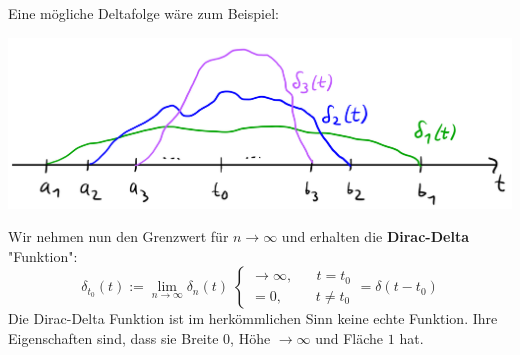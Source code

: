 \documentclass[11pt]{article}
\begin{document}
\vfill \null
\pagebreak

Eine mögliche Deltafolge wäre zum Beispiel:
\begin{center}
    \includegraphics[width=0.6\linewidth]{docimgs/Deltafolge_2.jpg}
\end{center}
Wir nehmen nun den Grenzwert für $n \to \infty$ und erhalten die \textbf{Dirac-Delta} "Funktion":
$$\delta_{t_0}(t) := \lim_{n \to \infty} \delta_n(t) \; \begin{cases}
    \to \infty, \hspace{20pt} t = t_0\\
    = 0, \hspace{28pt} t \neq t_0
\end{cases} = \delta(t-t_0)$$
Die Dirac-Delta Funktion ist im herkömmlichen Sinn keine echte Funktion. Ihre Eigenschaften sind, dass sie Breite $0$, Höhe $\to \infty$ und Fläche $1$ hat.
\end{document}
